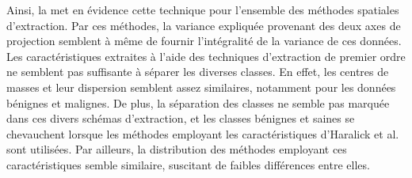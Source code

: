 Ainsi, la  met en évidence cette technique pour l'ensemble des méthodes spatiales d'extraction. Par ces méthodes, la variance expliquée provenant des deux axes de projection semblent à même de fournir l'intégralité de la variance de ces données. Les caractéristiques extraites à l'aide des techniques d'extraction de premier ordre ne semblent pas suffisante à séparer les diverses classes. En effet, les centres de masses et leur dispersion semblent assez similaires, notamment pour les données bénignes et malignes. De plus, la séparation des classes ne semble pas marquée dans ces divers schémas d'extraction, et les classes bénignes et saines se chevauchent lorsque les méthodes employant les caractéristiques d'Haralick et al. sont utilisées. Par ailleurs, la distribution des méthodes employant ces caractéristiques semble similaire, suscitant de faibles différences entre elles.\par

